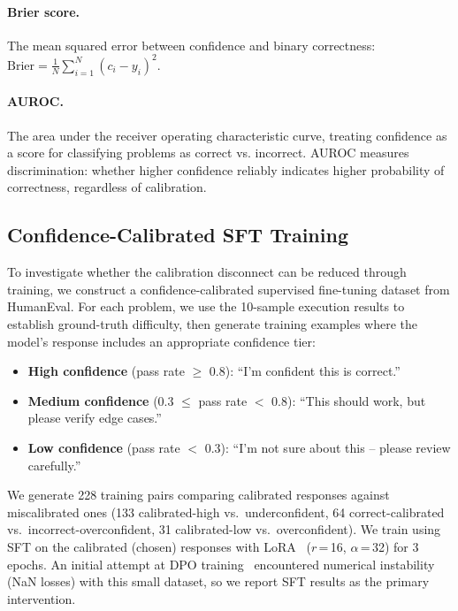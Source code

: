 \documentclass{article}
\begin{document}
\paragraph{Brier score.}
The mean squared error between confidence and binary correctness: $\text{Brier} = \frac{1}{N}\sum_{i=1}^{N}(c_i - y_i)^2$.

\paragraph{AUROC.}
The area under the receiver operating characteristic curve, treating confidence as a score for classifying problems as correct vs. incorrect. AUROC measures discrimination: whether higher confidence reliably indicates higher probability of correctness, regardless of calibration.

\subsection{Confidence-Calibrated SFT Training}
\label{sec:sft}

To investigate whether the calibration disconnect can be reduced through training, we construct a confidence-calibrated supervised fine-tuning dataset from HumanEval. For each problem, we use the 10-sample execution results to establish ground-truth difficulty, then generate training examples where the model's response includes an appropriate confidence tier:

\begin{itemize}
  \item \textbf{High confidence} (pass rate $\geq$ 0.8): ``I'm confident this is correct.''
  \item \textbf{Medium confidence} (0.3 $\leq$ pass rate $<$ 0.8): ``This should work, but please verify edge cases.''
  \item \textbf{Low confidence} (pass rate $<$ 0.3): ``I'm not sure about this -- please review carefully.''
\end{itemize}

We generate 228 training pairs comparing calibrated responses against miscalibrated ones (133 calibrated-high vs.\ underconfident, 64 correct-calibrated vs.\ incorrect-overconfident, 31 calibrated-low vs.\ overconfident). We train using SFT on the calibrated (chosen) responses with LoRA~\citep{hu2022lora} ($r$\,=\,16, $\alpha$\,=\,32) for 3 epochs. An initial attempt at DPO training~\citep{rafailov2023direct} encountered numerical instability (NaN losses) with this small dataset, so we report SFT results as the primary intervention.
\end{document}
